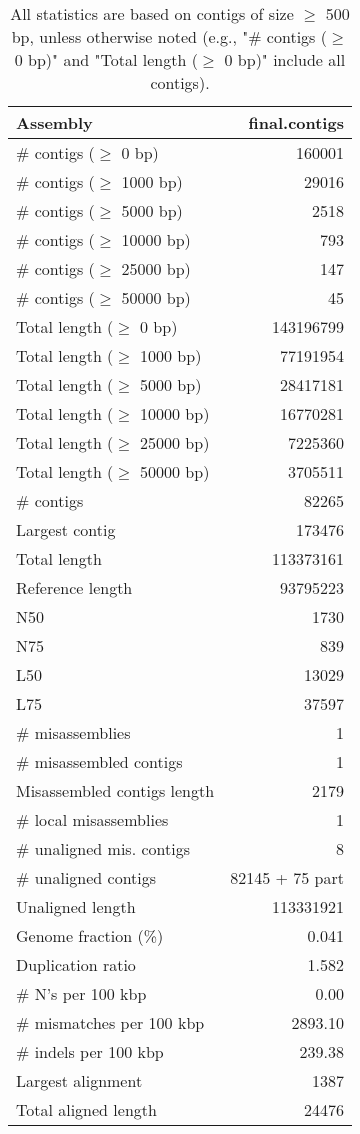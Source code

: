 \documentclass[12pt,a4paper]{article}
\begin{document}
\begin{table}[ht]
\begin{center}
\caption{All statistics are based on contigs of size $\geq$ 500 bp, unless otherwise noted (e.g., "\# contigs ($\geq$ 0 bp)" and "Total length ($\geq$ 0 bp)" include all contigs).}
\begin{tabular}{|l*{1}{|r}|}
\hline
Assembly & final.contigs \\ \hline
\# contigs ($\geq$ 0 bp) & 160001 \\ \hline
\# contigs ($\geq$ 1000 bp) & 29016 \\ \hline
\# contigs ($\geq$ 5000 bp) & 2518 \\ \hline
\# contigs ($\geq$ 10000 bp) & 793 \\ \hline
\# contigs ($\geq$ 25000 bp) & 147 \\ \hline
\# contigs ($\geq$ 50000 bp) & 45 \\ \hline
Total length ($\geq$ 0 bp) & 143196799 \\ \hline
Total length ($\geq$ 1000 bp) & 77191954 \\ \hline
Total length ($\geq$ 5000 bp) & 28417181 \\ \hline
Total length ($\geq$ 10000 bp) & 16770281 \\ \hline
Total length ($\geq$ 25000 bp) & 7225360 \\ \hline
Total length ($\geq$ 50000 bp) & 3705511 \\ \hline
\# contigs & 82265 \\ \hline
Largest contig & 173476 \\ \hline
Total length & 113373161 \\ \hline
Reference length & 93795223 \\ \hline
N50 & 1730 \\ \hline
N75 & 839 \\ \hline
L50 & 13029 \\ \hline
L75 & 37597 \\ \hline
\# misassemblies & 1 \\ \hline
\# misassembled contigs & 1 \\ \hline
Misassembled contigs length & 2179 \\ \hline
\# local misassemblies & 1 \\ \hline
\# unaligned mis. contigs & 8 \\ \hline
\# unaligned contigs & 82145 + 75 part \\ \hline
Unaligned length & 113331921 \\ \hline
Genome fraction (\%) & 0.041 \\ \hline
Duplication ratio & 1.582 \\ \hline
\# N's per 100 kbp & 0.00 \\ \hline
\# mismatches per 100 kbp & 2893.10 \\ \hline
\# indels per 100 kbp & 239.38 \\ \hline
Largest alignment & 1387 \\ \hline
Total aligned length & 24476 \\ \hline
\end{tabular}
\end{center}
\end{table}
\end{document}
